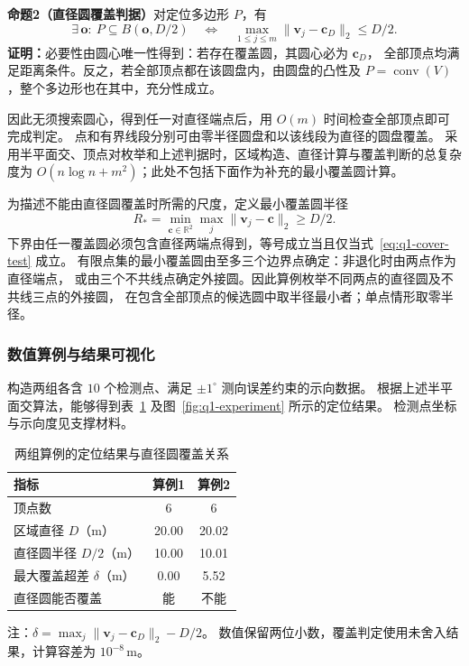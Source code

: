 \documentclass[UTF8,a4paper,12pt]{ctexart}
\begin{document}
\noindent\textbf{命题2（直径圆覆盖判据）}\quad 对定位多边形 $P$，有
\begin{equation}
  \exists\,\boldsymbol o:\ P\subseteq B(\boldsymbol o,D/2)
  \quad\Longleftrightarrow\quad
  \max_{1\leq j\leq m}\|\boldsymbol v_j-\boldsymbol c_D\|_2\leq D/2.
  \label{eq:q1-cover-test}
\end{equation}
\noindent\textbf{证明：}必要性由圆心唯一性得到：若存在覆盖圆，其圆心必为 $\boldsymbol c_D$，
全部顶点均满足距离条件。反之，若全部顶点都在该圆盘内，由圆盘的凸性及
$P=\operatorname{conv}(V)$，整个多边形也在其中，充分性成立。

因此无须搜索圆心，得到任一对直径端点后，用 $O(m)$ 时间检查全部顶点即可完成判定。
点和有界线段分别可由零半径圆盘和以该线段为直径的圆盘覆盖。
采用半平面交、顶点对枚举和上述判据时，区域构造、直径计算与覆盖判断的总复杂度为
$O(n\log n+m^2)$；此处不包括下面作为补充的最小覆盖圆计算。

为描述不能由直径圆覆盖时所需的尺度，定义最小覆盖圆半径
\begin{equation}
  R_*=\min_{\boldsymbol c\in\mathbb R^2}\max_j\|\boldsymbol v_j-\boldsymbol c\|_2
  \geq D/2.
  \label{eq:q1-minimum-circle}
\end{equation}
下界由任一覆盖圆必须包含直径两端点得到，等号成立当且仅当式~\eqref{eq:q1-cover-test} 成立。
有限点集的最小覆盖圆由至多三个边界点确定：非退化时由两点作为直径端点，
或由三个不共线点确定外接圆。因此算例枚举不同两点的直径圆及不共线三点的外接圆，
在包含全部顶点的候选圆中取半径最小者；单点情形取零半径。


\subsubsection{数值算例与结果可视化}
\label{sec:q1-experiment}

构造两组各含 $10$ 个检测点、满足 $\pm1^\circ$ 测向误差约束的示向数据。
根据上述半平面交算法，能够得到表~\ref{tab:q1-experiment} 及图~\ref{fig:q1-experiment} 所示的定位结果。
检测点坐标与示向度见支撑材料。

\begin{table}[htbp]
  \centering
  \caption{两组算例的定位结果与直径圆覆盖关系}
  \label{tab:q1-experiment}
  \begin{tabular}{lcc}
    \toprule
    指标 & 算例1 & 算例2 \\
    \midrule
    顶点数 & 6 & 6 \\
    区域直径 $D$（$\mathrm m$） & 20.00 & 20.02 \\
    直径圆半径 $D/2$（$\mathrm m$） & 10.00 & 10.01 \\
    最大覆盖超差 $\delta$（$\mathrm m$） & 0.00 & 5.52 \\
    直径圆能否覆盖 & 能 & 不能 \\
    \bottomrule
  \end{tabular}
  \par\smallskip
  \parbox{0.94\linewidth}{\footnotesize 注：$\delta=\max_j\|\boldsymbol v_j-\boldsymbol c_D\|_2-D/2$。
  数值保留两位小数，覆盖判定使用未舍入结果，计算容差为 $10^{-8}\,\mathrm m$。}
\end{table}
\end{document}
